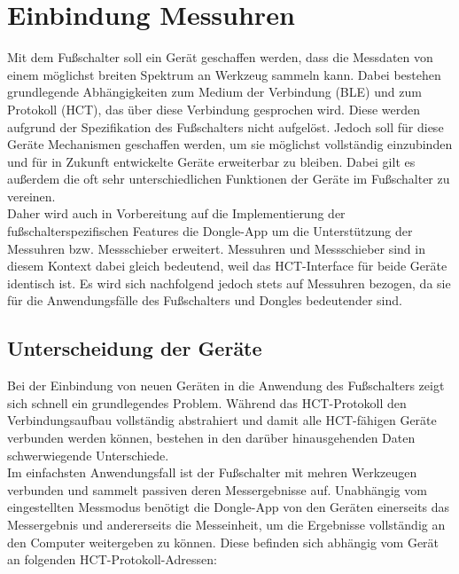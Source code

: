 \section{Einbindung Messuhren}
Mit dem Fußschalter soll ein Gerät geschaffen werden, dass die Messdaten von einem möglichst breiten Spektrum an Werkzeug sammeln kann. Dabei bestehen grundlegende Abhängigkeiten zum Medium der Verbindung (\ac{BLE}) und zum Protokoll (\ac{HCT}), das über diese Verbindung gesprochen wird. Diese werden aufgrund der Spezifikation des Fußschalters nicht aufgelöst. Jedoch soll für diese Geräte Mechanismen geschaffen werden, um sie möglichst vollständig einzubinden und für in Zukunft entwickelte Geräte erweiterbar zu bleiben. Dabei gilt es außerdem die oft sehr unterschiedlichen Funktionen der Geräte im Fußschalter zu vereinen.\\
Daher wird auch in Vorbereitung auf die Implementierung der fußschalterspezifischen Features die Dongle-App um die Unterstützung der Messuhren bzw. Messschieber erweitert. Messuhren und Messschieber sind in diesem Kontext dabei gleich bedeutend, weil das \ac{HCT}-Interface für beide Geräte identisch ist. Es wird sich nachfolgend jedoch stets auf Messuhren bezogen, da sie für die Anwendungsfälle des Fußschalters und Dongles bedeutender sind.

\subsection{Unterscheidung der Geräte}
Bei der Einbindung von neuen Geräten in die Anwendung des Fußschalters zeigt sich schnell ein grundlegendes Problem. Während das \ac{HCT}-Protokoll den Verbindungsaufbau vollständig abstrahiert und damit alle \ac{HCT}-fähigen Geräte verbunden werden können, bestehen in den darüber hinausgehenden Daten schwerwiegende Unterschiede.\\
Im einfachsten Anwendungsfall ist der Fußschalter mit mehren Werkzeugen verbunden und sammelt passiven deren Messergebnisse auf. Unabhängig vom eingestellten Messmodus benötigt die Dongle-App von den Geräten einerseits das Messergebnis und andererseits die Messeinheit, um die Ergebnisse vollständig an den Computer weitergeben zu können. Diese befinden sich abhängig vom Gerät an folgenden \ac{HCT}-Protokoll-Adressen:


